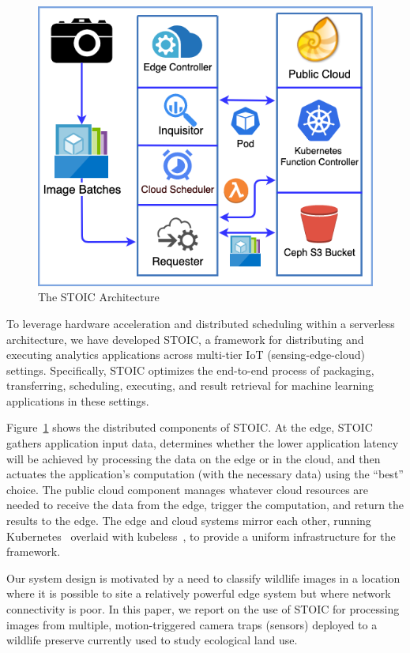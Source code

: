 \begin{figure}
    \centering
    \includegraphics[scale=0.4]{figures/STOIC.png}
    \caption{The STOIC Architecture \label{fig:STOIC}}
\end{figure}


To leverage hardware acceleration and distributed scheduling within a serverless architecture, we have developed STOIC, a framework for distributing and executing analytics applications across multi-tier IoT (sensing-edge-cloud) settings. Specifically, STO\-IC optimizes the end-to-end process of packaging, transferring, scheduling, executing, and result retrieval for machine learning applications in these settings.  

Figure~\ref{fig:STOIC} shows the distributed components of STOIC. At the edge, STOIC gathers application input data, determines whether the lower application latency will be achieved by processing the data on the edge or in the cloud, and then actuates the application's computation (with the necessary data) using the ``best'' choice. The public cloud component manages whatever cloud resources are needed to receive the data from the edge, trigger the computation, and return the results to the edge.  The edge and cloud systems mirror each other, running Kubernetes~\cite{ref:k8s-web,ref:k8s} overlaid with kubeless~\cite{ref:kubeless}, to provide a uniform infrastructure for the framework.

Our system design is motivated by a need to classify wildlife images in a location where it is possible to site a relatively powerful edge system but where network connectivity is poor.  In this paper, we report on the use of STOIC  for processing images from multiple, motion-triggered camera traps (sensors) deployed to a wildlife preserve currently used to study ecological land use.

